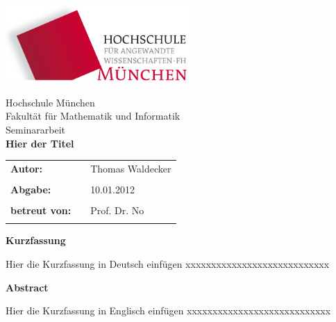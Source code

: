 %
\begin{titlepage}
\begin{flushright}
\includegraphics[width=70mm]{img/hm.jpg}%
\end{flushright}

\vspace*{20mm}
\begin{center}
{\Large Hochschule München}\\
{\large Fakultät für Mathematik und Informatik}\\

\vspace*{15mm}
{\huge Seminararbeit }\\

\vspace*{10mm}
{\huge \bfseries{ Hier der Titel }} \\
\vspace*{15mm} 
\end{center}

\vspace*{30mm}

\begin{tabular}{lll}
\textbf{\large {Autor:}} & & \large {Thomas Waldecker}\\
& & \\

\textbf{\large {Abgabe:}} & & \large {10.01.2012}\\
& & \\

\textbf{\large {betreut von:}} & & \large {Prof. Dr. No}\\
& & \\
\end{tabular}

\end{titlepage}


\thispagestyle{empty}
\clearpage

\begin{center}
{\Large \bfseries{ Kurzfassung }}\\
\end{center}

Hier die Kurzfassung in Deutsch einfügen
xxxxxxxxxxxxxxxxxxxxxxxxxxxx


\vspace*{10mm}
\begin{center}
{\Large \bfseries{ Abstract }}\\
\end{center}

Hier die Kurzfassung in Englisch einfügen
xxxxxxxxxxxxxxxxxxxxxxxxxxxx

\leereseite
\tableofcontents
\leereseite
